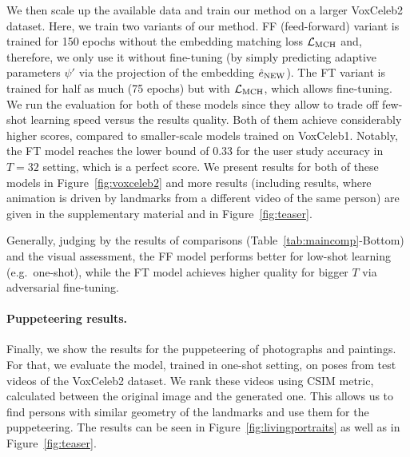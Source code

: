 \documentclass[10pt,twocolumn,letterpaper]{article}
\newcommand{\fig}[1]{Figure~\ref{fig:#1}}
\newcommand{\tab}[1]{Table~\ref{tab:#1}}
\newcommand{\e}{e}
\begin{document}
We then scale up the available data and train our method on a larger VoxCeleb2 dataset. Here, we train two variants of our method. FF (feed-forward) variant is trained for 150 epochs without the embedding matching loss $\mathcal{L}_\text{MCH}$ and, therefore, we only use it without fine-tuning (by simply predicting adaptive parameters $\psi'$ via the projection of the embedding $\hat\e\new$). The FT variant is trained for half as much (75 epochs) but with $\mathcal{L}_\text{MCH}$, which allows fine-tuning. We run the evaluation for both of these models since they allow to trade off few-shot learning speed versus the results quality. Both of them achieve considerably higher scores, compared to smaller-scale models trained on VoxCeleb1. Notably, the FT model reaches the lower bound of $0.33$ for the user study accuracy in $T=32$ setting, which is a perfect score. We present results for both of these models in \fig{voxceleb2} and more results (including results, where animation is driven by landmarks from a different video of the same person) are given in the supplementary material and in \fig{teaser}.

Generally, judging by the results of comparisons (\tab{maincomp}-Bottom) and the visual assessment, the FF model performs better for low-shot learning (e.g.\ one-shot), while the FT model achieves higher quality for bigger $T$ via adversarial fine-tuning.

\paragraph{Puppeteering results.}

Finally, we show the results for the puppeteering of photographs and paintings. For that, we evaluate the model, trained in one-shot setting, on poses from test videos of the VoxCeleb2 dataset. We rank these videos using CSIM metric, calculated between the original image and the generated one. This allows us to find persons with similar geometry of the landmarks and use them for the puppeteering. The results can be seen in \fig{livingportraits} as well as in \fig{teaser}.
\end{document}
